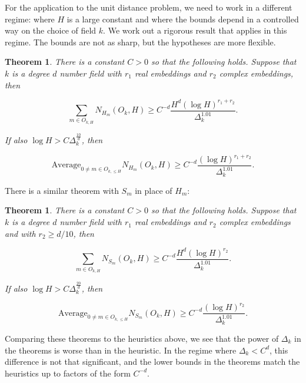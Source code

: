 \documentclass{amsart}
\newtheorem{theorem}[prop]{Theorem}
\newcommand{\Average}{\textrm{Average}}
\begin{document}
   For the application to the unit distance problem,  we need to work in a different regime: where $H$ is a large constant and where the bounds depend in a controlled way on the choice of field $k$.   We work out a rigorous result that applies in this regime.  The bounds are not as sharp, but the hypotheses are more flexible.  
\begin{theorem} \label{thmlowerhyp} There is a constant $C > 0$ so that the following holds.  Suppose that $k$ is a degree $d$ number field with $r_1$ real embeddings and $r_2$ complex embeddings, then

\begin{equation} \label{goal1}
 \sum_{m \in O_{k,H}} N_{H_m}(O_k, H) \ge C^{-d} \frac{ H^d (\log H)^{r_1 + r_2} }{\Delta_k^{1.01}}. 
 \end{equation}

If also $\log H > C \Delta_k^{\frac{10}{d}}$, then

\begin{equation}  \label{goal2}  \Average_{0 \not= m \in O_{k, \le H} } N_{H_m}(O_k, H) \ge C^{-d} \frac{ (\log H)^{r_1 + r_2} }{ \Delta_k^{1.01}}.  \end{equation} 

\end{theorem}

There is a similar theorem with $S_m$ in place of $H_m$:

\begin{theorem} \label{thmlowercir} There is a constant $C > 0$ so that the following holds.  Suppose that $k$ is a degree $d$ number field with $r_1$ real embeddings and $r_2$ complex embeddings and with $r_2 \ge d/10$, then

\begin{equation} \label{goal1}
 \sum_{m \in O_{k,H}} N_{S_m}(O_k, H) \ge C^{-d} \frac{ H^d (\log H)^{r_2} }{\Delta_k^{1.01}}. 
 \end{equation}

If also $\log H > C \Delta_k^{\frac{20}{d}}$, then

\begin{equation}  \label{goal2}  \Average_{0 \not= m \in O_{k, \le H} } N_{S_m}(O_k, H) \ge C^{-d} \frac{ (\log H)^{r_2} }{ \Delta_k^{1.01}}.  \end{equation} 

\end{theorem}

Comparing these theorems to the heuristics above,  we see that the power of $\Delta_k$ in the theorems is worse than in the heuristic.   In the regime where $\Delta_k < C^d$,  this difference is not that significant,  and the lower bounds in the theorems match the heuristics up to factors of the form 
$C^{-d}$.  
\end{document}
